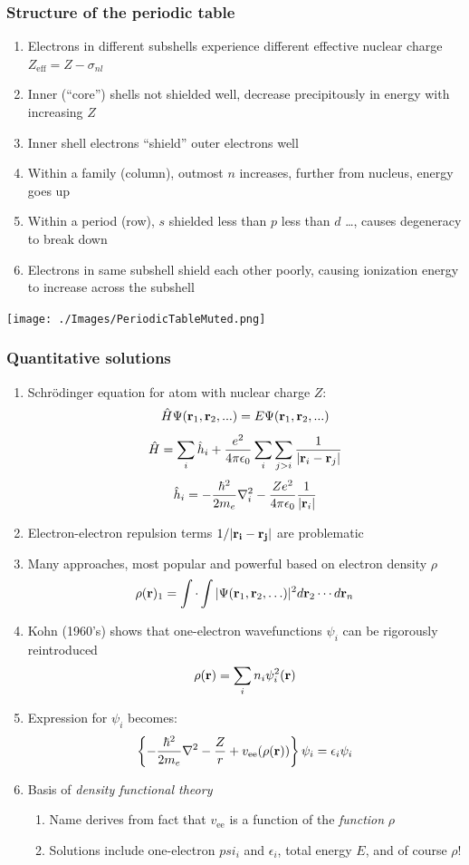 \documentclass[11pt]{article}
\begin{document}
\subsubsection{Structure of the periodic table}
\label{sec:orga4b2dc2}
\begin{enumerate}
\item Electrons in different subshells experience different effective nuclear charge \(Z_\mathrm{eff} = Z - \sigma_{nl}\)
\item Inner (``core'') shells not shielded well, decrease precipitously in energy with increasing \(Z\)
\item Inner shell electrons ``shield'' outer electrons well
\item Within a family (column), outmost \(n\) increases, further from nucleus, energy goes up
\item Within a period (row), \(s\) shielded less than \(p\) less than \(d\) \ldots{}, causes degeneracy to break down
\item Electrons in same subshell shield each other poorly, causing ionization energy to increase across the subshell
\end{enumerate}

\begin{center}
\texttt{[image: ./Images/PeriodicTableMuted.png]}
\end{center}
\subsubsection{Quantitative solutions}
\label{sec:orgd19b913}
\begin{enumerate}
\item Schr\"{o}dinger equation for atom with nuclear charge \(Z\):
\[\hat H \Psi({\bf r}_1, {\bf r}_2,...)=E \Psi({\bf r}_1, {\bf r}_2,...)\]
\[\hat H = \sum_i \hat h_i + \frac{e^2}{4 \pi
           \epsilon_0}\sum_i\sum_{j>i}\frac{1}{|{\bf r}_i-{\bf r}_j|}\]
\[\hat h_i = -\frac{\hbar^2}{2m_e}\nabla^2_i-\frac{Z
           e^2}{4\pi\epsilon_0}\frac{1}{|{\bf r}_i|}\]
\item Electron-electron repulsion terms \(1/| {\bf r_i} - {\bf r_j} |\) are problematic
\item Many approaches, most popular and powerful based on electron density \(\rho\)
\[\rho({\bf r})_1 = \int \cdot \int |\Psi({\bf r}_1, {\bf r}_2,\ldots)|^2 d{\bf r}_2 \cdots d{\bf r}_n\]
\item Kohn (1960's) shows that one-electron wavefunctions \(\psi_i\) can be rigorously reintroduced
\[ \rho({\bf r}) = \sum_i n_i \psi_i^2({\bf r})\]
\item Expression for \(\psi_i\) becomes:
\[ \left \{ -\frac{\hbar^2}{2m_e}\nabla^2 - \frac{Z}{r} + v_\text{ee}(\rho({\bf r})) \right \}\psi_i = \epsilon_i \psi_i \]
\item Basis of \emph{density functional theory}
\begin{enumerate}
\item Name derives from fact that \(v_\text{ee}\) is a function of the \emph{function} \(\rho\)
\item Solutions include one-electron \(psi_i\) and \(\epsilon_i\), total energy \(E\), and of course \(\rho\)!
\end{enumerate}
\end{enumerate}
\end{document}
